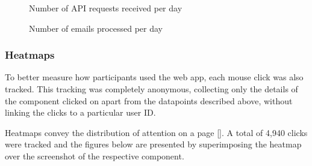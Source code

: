 \documentclass{article}
\begin{document}
\begin{figure}
	\centering
	\begin{minipage}{.47\textwidth}
		\caption{Number of API requests received per day}
	\end{minipage}%
	\hspace{.5cm}
	\begin{minipage}{.47\textwidth}
		\caption{Number of emails processed per day}
	\end{minipage}
\end{figure}

\subsubsection{Heatmaps}

To better measure how participants used the web app, each mouse click was also tracked. This tracking was completely anonymous, collecting only the details of the component clicked on apart from the datapoints described above, without linking the clicks to a particular user ID.

Heatmaps convey the distribution of attention on a page []. A total of 4,940 clicks were tracked and the figures below are presented by superimposing the heatmap over the screenshot of the respective component.
\end{document}
